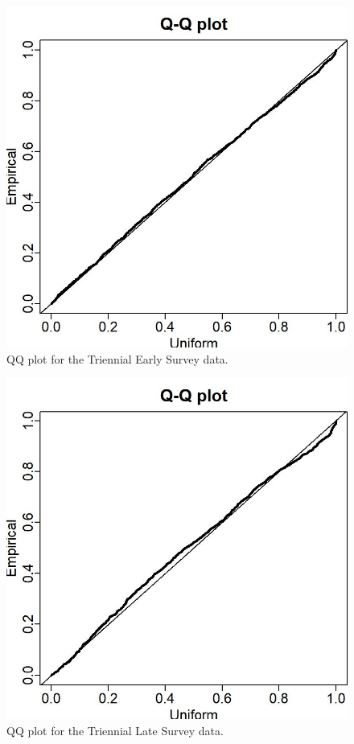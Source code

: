 \documentclass[12pt,]{article}
\begin{document}
\begin{figure}
\centering
\includegraphics{Figures/tri_early_Posterior_Predictive-Histogram-1.jpg}
\caption{QQ plot for the Triennial Early Survey data.
\label{fig:tri_early_qq}}
\end{figure}

\FloatBarrier

\begin{figure}
\centering
\includegraphics{Figures/tri_late_Posterior_Predictive-Histogram-1.jpg}
\caption{QQ plot for the Triennial Late Survey data.
\label{fig:tri_late_qq}}
\end{figure}
\end{document}
